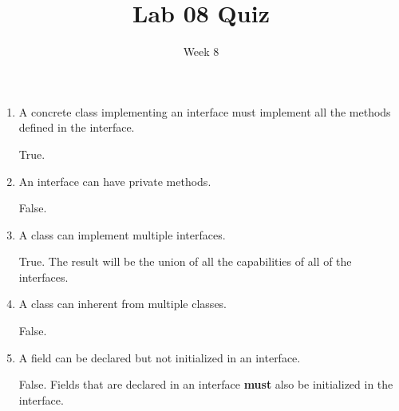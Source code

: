 \documentclass[12pt]{article}
\title{Lab 08 Quiz}
\date{Week 8}
\begin{document}
 

\Instructions

\begin{enumerate}
\vspace{2em}

\item {} \tf A concrete class implementing an interface must implement all the methods defined in the interface.

\Ans True. 

\vspace{3em}
\item {} \tf An interface can have private methods.

\Ans False.

\vspace{2em}

\item {} \tf A class can implement multiple interfaces.

\Ans True. The result will be the union of all the capabilities of all of the interfaces.

\vspace{2em}

\item {} \tf A class can inherent from multiple classes.

\Ans False.

\vspace{2em}

\item {} \tf A field can be declared but not initialized in an interface.

\Ans False. Fields that are declared in an interface  \textbf{must} also be initialized in the interface.

\vspace{2em}

\end{enumerate}   
\end{document}
